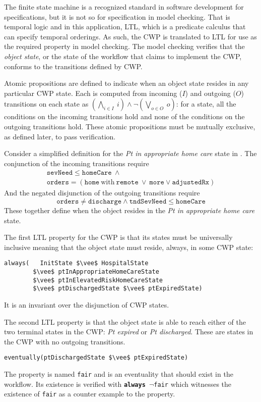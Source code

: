 The finite state machine is a recognized standard in software development for specifications, but it is not so for specification in model checking.
That is temporal logic and in this application, LTL, which is a predicate calculus that can specify temporal orderings.
As such, the CWP is translated to LTL for use as the required property in model checking.
The model checking verifies that the \emph{object state}, or the state of the workflow that claims to implement the CWP, conforms to the transitions defined by CWP.

Atomic propositions are defined to indicate when an object state resides in any particular CWP state.
Each is computed from incoming ($I$) and outgoing ($O$) transitions on each state as $(\bigwedge_{i \in I}\ i) \wedge \neg(\bigvee_{o \in O}\ o)$: for a state, all the conditions on the incoming transitions hold and none of the conditions on the outgoing transitions hold.
These atomic propositions must be mutually exclusive, as defined later, to pass verification.

Consider a simplified definition for the \emph{Pt in appropriate home care} state in . The conjunction of the incoming transitions require
%
\[
\begin{array}{l}
  \mathtt{sevNeed} \le \mathtt{homeCare}\ \wedge\ \\
  \mathtt{orders} = (\mathtt{home}\ \mathrm{with}\ \mathtt{remote}\ \vee\ 
                    \mathtt{more} \vee \mathtt{adjustedRx})
\end{array}
\]
%
And the negated disjunction of the outgoing transitions require
%
\[
  \mathtt{orders} \neq \mathtt{discharge} \wedge \mathtt{tndSevNeed} \le \mathtt{homeCare}
\]
%
\noindent These together define when the object resides in the \emph{Pt in appropriate home care} state.

The first LTL property for the CWP is that its states must be universally inclusive meaning that the object state must reside, always, in some CWP state:
%
{\small
\begin{lstlisting}[style=myPromela,mathescape=true]
always(   InitState $\vee$ HospitalState 
        $\vee$ ptInAppropriateHomeCareState 
        $\vee$ ptInElevatedRiskHomeCareState 
        $\vee$ ptDischargedState $\vee$ ptExpiredState)
\end{lstlisting}
}
%
\noindent It is an invariant over the disjunction of CWP states.

The second LTL property is that the object state is able to reach either of the two terminal states in the CWP: \emph{Pt expired} or \emph{Pt discharged}.
These are states in the CWP with no outgoing transitions.
%
{\small
\begin{lstlisting}[style=myPromela,mathescape=true]
eventually(ptDischargedState $\vee$ ptExpiredState)
\end{lstlisting}
}
%
\noindent The property is named \texttt{fair} and is an eventuality that should exist in the workflow.
Its existence is verified with \texttt{\textbf{always} $\neg$fair} which witnesses the existence of \texttt{fair} as a counter example to the property.


